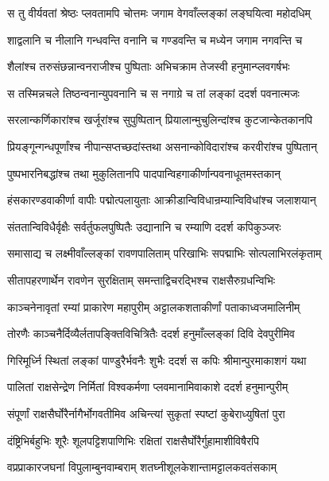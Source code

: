 \twolineshloka
{स तु वीर्यवतां श्रेष्ठः प्लवतामपि चोत्तमः}
{जगाम वेगवाँल्लङ्कां लङ्घयित्वा महोदधिम्} %

\twolineshloka
{शाद्वलानि च नीलानि गन्धवन्ति वनानि च}
{गण्डवन्ति च मध्येन जगाम नगवन्ति च} %

\twolineshloka
{शैलांश्च तरुसंछन्नान्वनराजीश्च पुष्पिताः}
{अभिचक्राम तेजस्वी हनुमान्प्लवगर्षभः} %

\twolineshloka
{स तस्मिन्नचले तिष्ठन्वनान्युपवनानि च}
{स नगाग्रे च तां लङ्कां ददर्श पवनात्मजः} %

\twolineshloka
{सरलान्कर्णिकारांश्च खर्जूरांश्च सुपुष्पितान्}
{प्रियालान्मुचुलिन्दांश्च कुटजान्केतकानपि} %

\twolineshloka
{प्रियङ्गून्गन्धपूर्णांश्च नीपान्सप्तच्छदांस्तथा}
{असनान्कोविदारांश्च करवीरांश्च पुष्पितान्} %

\twolineshloka
{पुष्पभारनिबद्धांश्च तथा मुकुलितानपि}
{पादपान्विहगाकीर्णान्पवनाधूतमस्तकान्} %

\twolineshloka
{हंसकारण्डवाकीर्णा वापीः पद्मोत्पलायुताः}
{आक्रीडान्विविधान्रम्यान्विविधांश्च जलाशयान्} %

\twolineshloka
{संततान्विविधैर्वृक्षैः सर्वर्तुफलपुष्पितैः}
{उद्यानानि च रम्याणि ददर्श कपिकुञ्जरः} %

\twolineshloka
{समासाद्य च लक्ष्मीवाँल्लङ्कां रावणपालिताम्}
{परिखाभिः सपद्माभिः सोत्पलाभिरलंकृताम्} %

\twolineshloka
{सीतापहरणार्थेन रावणेन सुरक्षिताम्}
{समन्ताद्विचरद्भिश्च राक्षसैरुग्रधन्विभिः} %

\twolineshloka
{काञ्चनेनावृतां रम्यां प्राकारेण महापुरीम्}
{अट्टालकशताकीर्णां पताकाध्वजमालिनीम्} %

\twolineshloka
{तोरणैः काञ्चनैर्दिव्यैर्लतापङ्क्तिविचित्रितैः}
{ददर्श हनुमाँल्लङ्कां दिवि देवपुरीमिव} %

\twolineshloka
{गिरिमूर्ध्नि स्थितां लङ्कां पाण्डुरैर्भवनैः शुभैः}
{ददर्श स कपिः श्रीमान्पुरमाकाशगं यथा} %

\twolineshloka
{पालितां राक्षसेन्द्रेण निर्मितां विश्वकर्मणा}
{प्लवमानामिवाकाशे ददर्श हनुमान्पुरीम्} %

\twolineshloka
{संपूर्णां राक्षसैर्घोरैर्नागैर्भोगवतीमिव}
{अचिन्त्यां सुकृतां स्पष्टां कुबेराध्युषितां पुरा} %

\twolineshloka
{दंष्ट्रिभिर्बहुभिः शूरैः शूलपट्टिशपाणिभिः}
{रक्षितां राक्षसैर्घोरैर्गुहामाशीविषैरपि} %

\twolineshloka
{वप्रप्राकारजघनां विपुलाम्बुनवाम्बराम्}
{शतघ्नीशूलकेशान्तामट्टालकवतंसकाम्} %

